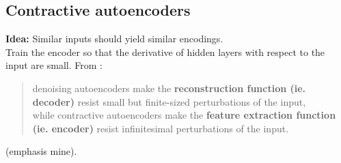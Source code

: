 \documentclass[../main]{subfiles}
\begin{document}
\subsection{Contractive autoencoders}
\textbf{Idea:} Similar inputs should yield similar encodings. \\
Train the encoder so that the derivative of hidden layers with respect to the input are small.
From \cite{what-regularized-autoencoders-learn}: \\
\blockquote{
    denoising autoencoders make the \textbf{reconstruction function (ie. decoder)} resist small but ﬁnite-sized perturbations of the input, \\
    while contractive autoencoders make the \textbf{feature extraction function (ie. encoder)} resist infinitesimal perturbations of the input.
} (emphasis mine).
\end{document}
